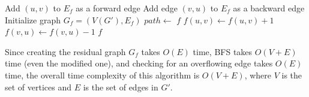\documentclass{article}
\begin{document}
\begin{itemize}
\begin{algorithm}[H]
\begin{algorithmic}[1]
              \State Add $(u, v)$ to $E_f$ as a forward edge
            \EndIf
              \State Add edge $(v, u)$ to $E_f$ as a backward edge
            \EndIf
          \EndFor
          \State Initialize graph $G_f = (V(G'), E_f)$ 
          \State $path \gets$ 
            \State \Return $f$
          \EndIf
              \State $f(u, v) \gets f(u, v) + 1$
            \Else
              \State $f(v, u) \gets f(v, u) - 1$
            \EndIf
          \EndFor
          \State \Return $f$
        \EndFunction
      \end{algorithmic}
    \end{algorithm}
    Since creating the residual graph $G_f$ takes $O(E)$ time, BFS takes $O(V + E)$ time (even the modified one), and checking for an overflowing edge takes $O(E)$ time, the overall time complexity of this algorithm is $O(V + E)$, where $V$ is the set of vertices and $E$ is the set of edges in $G'$.
  \end{itemize}
\end{document}
